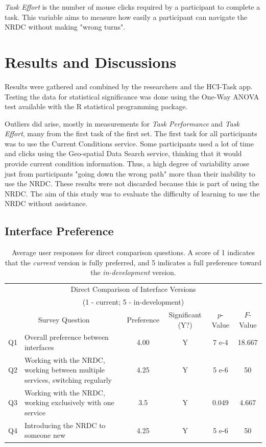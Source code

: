 \documentclass{acm_proc_article-sp}
\begin{document}
\emph{Task Effort} is the number of mouse clicks required by a participant to complete a task. This variable aims to measure how easily a participant can navigate the NRDC without making "wrong turns".

%
%
\section{Results and Discussions}
Results were gathered and combined by the researchers and the HCI-Task app. Testing the data for statistical significance was done using the One-Way ANOVA test available with the R statistical programming package.

Outliers did arise, mostly in measurements for \emph{Task Performance} and \emph{Task Effort}, many from the first task of the first set. The first task for all participants was to use the Current Conditions service. Some participants used a lot of time and clicks using the Geo-spatial Data Search service, thinking that it would provide current condition information. Thus, a high degree of variability arose just from participants "going down the wrong path" more than their inability to use the NRDC. These results were not discarded because this is part of using the NRDC. The aim of this study was to evaluate the difficulty of learning to use the NRDC without assistance.

%
\subsection{Interface Preference}
\begin{table}
    \centering
    \begin{tabular}{| c | p{8cm} || c || c | c | c |}
    \hline
    \multicolumn{6}{|c|}{Direct Comparison of Interface Versions} \\
    \multicolumn{6}{|c|}{(1 - current; 5 - in-development)} \\
    \multicolumn{2}{|c||}{Survey Question} & Preference & Significant (Y?) & $p$-Value & $F$-Value \\
    \hline
    \hline
    Q1 & Overall preference between interfaces &
    4.00 & Y & 7 e-4 & 18.667 \\
    \hline
    Q2 & Working with the NRDC, working between multiple services, switching regularly &
    4.25 & Y & 5 e-6 & 50 \\
    \hline
    Q3 & Working with the NRDC, working exclusively with one service  &
    3.5 & Y & 0.049 & 4.667 \\
    \hline
    Q4 & Introducing the NRDC to someone new &
    4.25 & Y & 5 e-6 & 50 \\
    \hline
    \end{tabular}
    
    \caption{Average user responses for direct comparison questions. A score of 1 indicates that the \emph{current} version is fully preferred, and 5 indicates a full preference toward the \emph{in-development} version.}
    \label{tab:avg_direct_comparison}
\end{table}
\end{document}
